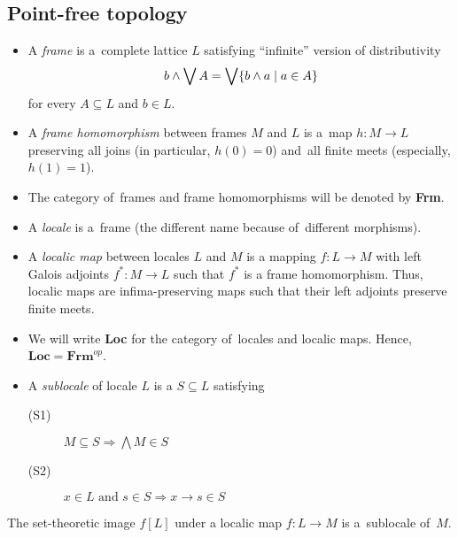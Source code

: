 \subsection*{Point-free topology}

\begin{itemize}
\item A \emph{frame} is a~complete lattice $L$ satisfying ``infinite'' version
of distributivity
\[
  b \wedge \bigvee A = \bigvee \{ b \wedge a \mid a\in A \}
\]
for every $A\subseteq L$ and $b\in L$.

\item A \emph{frame homomorphism} between frames $M$ and $L$ is a~map $h\colon
M \to L$ preserving all joins (in particular, $h(0) = 0$) and~all finite meets
(especially, $h(1) = 1$).

\item The category of~frames and frame homomorphisms will be denoted by {\bf
Frm}.

\item A \emph{locale} is a~frame (the different name because of~different
morphisms).

\item A \emph{localic map} between locales $L$ and $M$ is a mapping $f\colon L
\to M$ with left Galois adjoints $f^*\colon M \to L$ such that $f^*$ is a frame
homomorphism.
Thus, localic maps are infima-preserving maps such that their left adjoints
preserve finite meets.

\item We will write {\bf Loc} for the category of~locales and localic maps.
Hence, $\mathbf{Loc} = \mathbf{Frm}^{op}$.

\item A \emph{sublocale} of locale $L$ is a $S\subseteq L$ satisfying
  \begin{description}
  \item[(S1)] $M\subseteq S \Longrightarrow \bigwedge M\in S$
  \item[(S2)] $x\in L \text{ and } s\in S \Longrightarrow x \rightarrow s \in S$ 
  \end{description}
\end{itemize}

\begin{fact}
  The set-theoretic image $f[L]$ under a localic map $f\colon L\to M$
  is a~sublocale of~$M$.
\end{fact}


